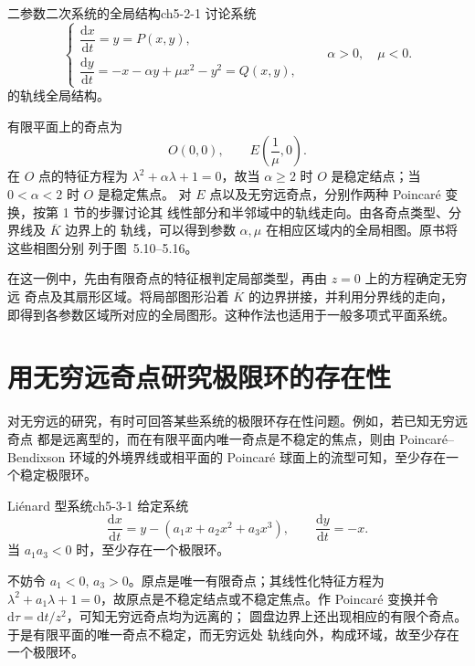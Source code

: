 \begin{example}{二参数二次系统的全局结构}{ch5-2-1}
讨论系统
\[
  \begin{cases}
    \dfrac{\mathrm{d}x}{\mathrm{d}t}=y=P(x,y),\\[3pt]
    \dfrac{\mathrm{d}y}{\mathrm{d}t}=-x-\alpha y+\mu x^2-y^2=Q(x,y),
  \end{cases}\qquad \alpha>0,\quad \mu<0. \tag{2.1}
\]
的轨线全局结构。
\end{example}
\begin{solution}
有限平面上的奇点为
\[
  O(0,0),\qquad E\left(\dfrac{1}{\mu},0\right).
\]
在 $O$ 点的特征方程为 $\lambda^2+\alpha\lambda+1=0$，故当
$\alpha\ge2$ 时 $O$ 是稳定结点；当 $0<\alpha<2$ 时 $O$ 是稳定焦点。
对 $E$ 点以及无穷远奇点，分别作两种 Poincar\'e 变换，按第 1 节的步骤讨论其
线性部分和半邻域中的轨线走向。由各奇点类型、分界线及 $\overline K$ 边界上的
轨线，可以得到参数 $\alpha,\mu$ 在相应区域内的全局相图。原书将这些相图分别
列于图~5.10--5.16。
\end{solution}


在这一例中，先由有限奇点的特征根判定局部类型，再由 $z=0$ 上的方程确定无穷远
奇点及其扇形区域。将局部图形沿着 $\overline K$ 的边界拼接，并利用分界线的走向，
即得到各参数区域所对应的全局图形。这种作法也适用于一般多项式平面系统。

\section{用无穷远奇点研究极限环的存在性}

对无穷远的研究，有时可回答某些系统的极限环存在性问题。例如，若已知无穷远奇点
都是远离型的，而在有限平面内唯一奇点是不稳定的焦点，则由 Poincar\'e--Bendixson
环域的外境界线或相平面的 Poincar\'e 球面上的流型可知，至少存在一个稳定极限环。

\begin{example}{Liénard 型系统}{ch5-3-1}
给定系统
\[
  \dfrac{\mathrm{d}x}{\mathrm{d}t}=y-(a_1x+a_2x^2+a_3x^3),\qquad
  \dfrac{\mathrm{d}y}{\mathrm{d}t}=-x. \tag{3.1}
\]
当 $a_1a_3<0$ 时，至少存在一个极限环。
\end{example}
\begin{solution}
不妨令 $a_1<0$, $a_3>0$。原点是唯一有限奇点；其线性化特征方程为
$\lambda^2+a_1\lambda+1=0$，故原点是不稳定结点或不稳定焦点。作
Poincar\'e 变换并令 $\mathrm{d}\tau=\mathrm{d}t/z^2$，可知无穷远奇点均为远离的；
圆盘边界上还出现相应的有限个奇点。于是有限平面的唯一奇点不稳定，而无穷远处
轨线向外，构成环域，故至少存在一个极限环。
\end{solution}

